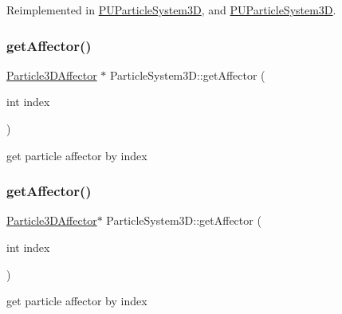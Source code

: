Reimplemented in \hyperlink{classPUParticleSystem3D_a46c2d79b09fcac96e81be307f9148fea}{P\+U\+Particle\+System3D}, and \hyperlink{classPUParticleSystem3D_ac4ab268d41e408ba4c2636827717cf48}{P\+U\+Particle\+System3D}.

\mbox{\label{classParticleSystem3D_a68fde91bc0333e387cc31d84ba69092c}} 
\subsubsection{\texorpdfstring{get\+Affector()}{getAffector()}\hspace{0.1cm}{\footnotesize\ttfamily [1/2]}}
{\footnotesize\ttfamily \hyperlink{classParticle3DAffector}{Particle3\+D\+Affector} $\ast$ Particle\+System3\+D\+::get\+Affector (\begin{DoxyParamCaption}\item[{int}]{index }\end{DoxyParamCaption})}

get particle affector by index \mbox{\label{classParticleSystem3D_ae6ada6195fe2ad8616385ecd370deaac}} 
\subsubsection{\texorpdfstring{get\+Affector()}{getAffector()}\hspace{0.1cm}{\footnotesize\ttfamily [2/2]}}
{\footnotesize\ttfamily \hyperlink{classParticle3DAffector}{Particle3\+D\+Affector}$\ast$ Particle\+System3\+D\+::get\+Affector (\begin{DoxyParamCaption}\item[{int}]{index }\end{DoxyParamCaption})}

get particle affector by index \mbox{\label{classParticleSystem3D_aa7437bbc0845857deea675f0fb137314}} 

